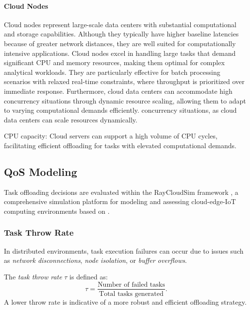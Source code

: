 \documentclass[preprint,12pt]{elsarticle}
\begin{document}
\paragraph{Cloud Nodes}
\label{subsubsec:Cloud}
Cloud nodes represent large-scale data centers with substantial computational and storage capabilities. Although they typically have higher baseline latencies because of greater network distances, they are well suited for computationally intensive applications. Cloud nodes excel in handling large tasks that demand significant CPU and memory resources, making them optimal for complex analytical workloads. They are particularly effective for batch processing scenarios with relaxed real-time constraints, where throughput is prioritized over immediate response. Furthermore, cloud data centers can accommodate high concurrency situations through dynamic resource scaling, allowing them to adapt to varying computational demands efficiently. concurrency situations, as cloud data centers can scale resources dynamically.


CPU capacity: Cloud servers can support a high volume of CPU cycles, facilitating efficient offloading for tasks with elevated computational demands.

\subsection{QoS Modeling}
\label{sec:simulation_modeling}

Task offloading decisions are evaluated within the RayCloudSim framework \cite{zhang2022osttd}, a comprehensive simulation platform for modeling and assessing cloud-edge-IoT computing environments based on \cite{WiesnerThamsen_LEAF_2021}.

\subsubsection{Task Throw Rate}
\label{subsubsec:task_throw_rate}

In distributed environments, task execution failures can occur due to issues such as \emph{network disconnections}, \emph{node isolation}, or \emph{buffer overflows}.

The \emph{task throw rate} \(\tau\) is defined as:
\begin{equation}
\tau = \frac{\text{Number of failed tasks}}{\text{Total tasks generated}}.
\end{equation}
A lower throw rate is indicative of a more robust and efficient offloading strategy.
\end{document}
